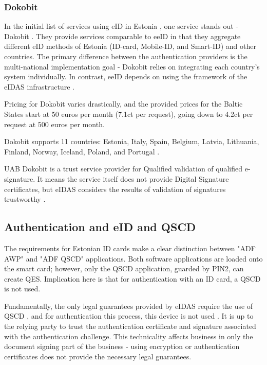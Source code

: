 \subsubsection{Dokobit}

In the initial list of services using eID in Estonia \cite{ut-eidinestonia}, one service stands out - Dokobit \cite{dokobit}. They provide services comparable to eeID in that they aggregate different eID methods of Estonia (ID-card, Mobile-ID, and Smart-ID) and other countries. The primary difference between the authentication providers is the multi-national implementation goal - Dokobit relies on integrating each country's system individually. In contrast, eeID depends on using the framework of the eIDAS infrastructure \cite{eeid}.

Pricing for Dokobit varies drastically, and the provided prices for the Baltic States \cite{dokobit-pricing} start at 50 euros per month (7.1ct per request), going down to 4.2ct per request at 500 euros per month.

Dokobit supports 11 countries: Estonia, Italy, Spain, Belgium, Latvia, Lithuania, Finland, Norway, Iceland, Poland, and Portugal \cite{dokobit}.

UAB Dokobit is a trust service provider for Qualified validation of qualified e-signature. It means the service itself does not provide Digital Signature certificates, but eIDAS considers the results of validation of signatures trustworthy \cite{eu-trustservices}.

\subsection{Authentication and eID and QSCD}


The requirements for Estonian ID cards make a clear distinction between "ADF AWP" and "ADF QSCD" applications. Both software applications are loaded onto the smart card; however, only the QSCD application, guarded by PIN2, can create QES. Implication here is that for authentication with an ID card, a QSCD is not used.

Fundamentally, the only legal guarantees provided by eIDAS require the use of QSCD \cite{eulaw-eidas}, and for authentication this process, this device is not used \cite{ee-id-tech}. It is up to the relying party to trust the authentication certificate and signature associated with the authentication challenge. This technicality affects business in only the document signing part of the business - using encryption or authentication certificates does not provide the necessary legal guarantees.

